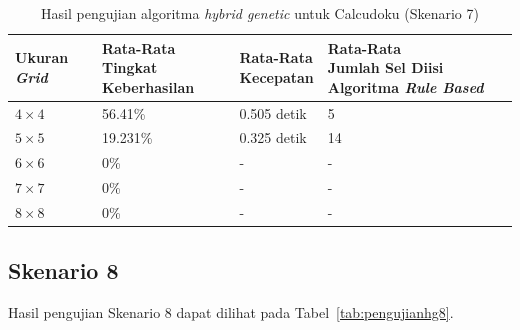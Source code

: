 \begin{table}
\centering
\captionsetup{justification=centering}
\caption[Hasil pengujian algoritma \textit{hybrid genetic} untuk Calcudoku (Skenario 7)]{Hasil pengujian algoritma \textit{hybrid genetic} untuk Calcudoku (Skenario 7)}
\begin{tabular}{| l | l | l | l |}
\hline
Ukuran \textit{Grid} & \makecell[c]{Rata-Rata \\ Tingkat Keberhasilan} & \makecell[c]{Rata-Rata \\ Kecepatan} & \makecell[c]{Rata-Rata \\ Jumlah Sel Diisi Algoritma \textit{Rule Based}} \\
\hline \hline
\begin{math}4 \times 4\end{math} & 56.41\% & 0.505 detik & 5 \\
\hline
\begin{math}5 \times 5\end{math} & 19.231\% & 0.325 detik & 14 \\
\hline
\begin{math}6 \times 6\end{math} & 0\% & - & - \\
\hline
\begin{math}7 \times 7\end{math} & 0\% & - & - \\
\hline
\begin{math}8 \times 8\end{math} & 0\% & - & - \\
\hline
\end{tabular}
\label{tab:pengujianhg7}
\end{table}

\clearpage

\subsection{Skenario 8}
\label{sec:skenario8}

Hasil pengujian Skenario 8 dapat dilihat pada Tabel~\ref{tab:pengujianhg8}.

